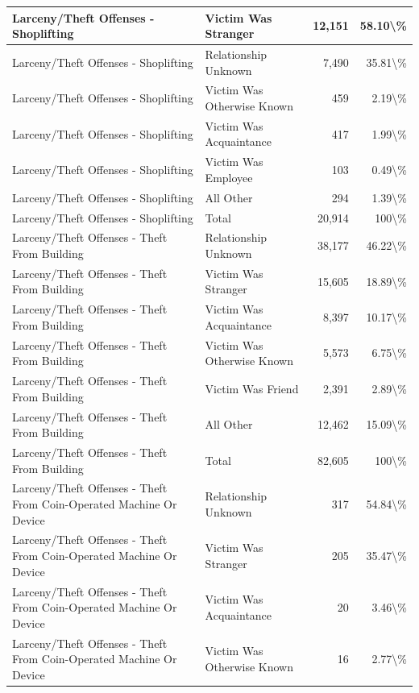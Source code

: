 \documentclass[
]{krantz}
\begin{document}
\begin{longtable}[t]{l|l|r|r}
\hline
Larceny/Theft Offenses - Shoplifting & Victim Was Stranger & 12,151 & 58.10\textbackslash{}\%\\
\hline
Larceny/Theft Offenses - Shoplifting & Relationship Unknown & 7,490 & 35.81\textbackslash{}\%\\
\hline
Larceny/Theft Offenses - Shoplifting & Victim Was Otherwise Known & 459 & 2.19\textbackslash{}\%\\
\hline
Larceny/Theft Offenses - Shoplifting & Victim Was Acquaintance & 417 & 1.99\textbackslash{}\%\\
\hline
Larceny/Theft Offenses - Shoplifting & Victim Was Employee & 103 & 0.49\textbackslash{}\%\\
\hline
Larceny/Theft Offenses - Shoplifting & All Other & 294 & 1.39\textbackslash{}\%\\
\hline
Larceny/Theft Offenses - Shoplifting & Total & 20,914 & 100\textbackslash{}\%\\
\hline
Larceny/Theft Offenses - Theft From Building & Relationship Unknown & 38,177 & 46.22\textbackslash{}\%\\
\hline
Larceny/Theft Offenses - Theft From Building & Victim Was Stranger & 15,605 & 18.89\textbackslash{}\%\\
\hline
Larceny/Theft Offenses - Theft From Building & Victim Was Acquaintance & 8,397 & 10.17\textbackslash{}\%\\
\hline
Larceny/Theft Offenses - Theft From Building & Victim Was Otherwise Known & 5,573 & 6.75\textbackslash{}\%\\
\hline
Larceny/Theft Offenses - Theft From Building & Victim Was Friend & 2,391 & 2.89\textbackslash{}\%\\
\hline
Larceny/Theft Offenses - Theft From Building & All Other & 12,462 & 15.09\textbackslash{}\%\\
\hline
Larceny/Theft Offenses - Theft From Building & Total & 82,605 & 100\textbackslash{}\%\\
\hline
Larceny/Theft Offenses - Theft From Coin-Operated Machine Or Device & Relationship Unknown & 317 & 54.84\textbackslash{}\%\\
\hline
Larceny/Theft Offenses - Theft From Coin-Operated Machine Or Device & Victim Was Stranger & 205 & 35.47\textbackslash{}\%\\
\hline
Larceny/Theft Offenses - Theft From Coin-Operated Machine Or Device & Victim Was Acquaintance & 20 & 3.46\textbackslash{}\%\\
\hline
Larceny/Theft Offenses - Theft From Coin-Operated Machine Or Device & Victim Was Otherwise Known & 16 & 2.77\textbackslash{}\%\\

\end{longtable}
\end{document}
